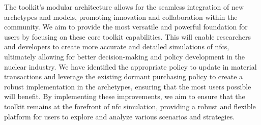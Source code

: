 The toolkit's modular architecture allows for the seamless integration of new
archetypes and models, promoting innovation and collaboration within the
\cyclus community. We aim to provide the most versatile and powerful foundation
for \cyclus users by focusing on these core toolkit capabilities. This will
enable researchers and developers to create more accurate and detailed
simulations of \glspl{nfc}, ultimately allowing for better decision-making and
policy development in the nuclear industry. We have identified the appropriate
policy to update in material transactions and leverage the existing dormant
purchasing policy to create a robust implementation in the \cycamore
archetypes, ensuring that the most users possible will benefit. By implementing
these improvements, we aim to ensure that the \cyclus toolkit remains at the
forefront of \gls{nfc} simulation, providing a robust and flexible platform for
users to explore and analyze various scenarios and strategies.